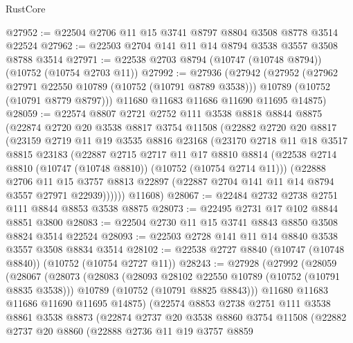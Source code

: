 \begin{lexlean}{RustCore}
\begin{coremodule}
@27952 := @22504 @2706 @11 @15 @3741 @8797 @8804 @3508 @8778 @3514 @22524
@27962 := @22503 @2704 @141 @11 @14 @8794 @3538 @3557 @3508 @8788 @3514
@27971 := @22538 @2703 @8794 (@10747 (@10748 @8794)) (@10752 (@10754 @2703 @11))
@27992 := @27936
    (@27942
      (@27952
        (@27962 @27971 @22550 @10789 (@10752 (@10791 @8789 @3538)))
        @10789
        (@10752 (@10791 @8779 @8797)))
      @11680
      @11683
      @11686
      @11690
      @11695
      @14875)
@28059 := @22574
    @8807
    @2721
    @2752
    @111
    @3538
    @8818
    @8844
    @8875
    (@22874
      @2720
      @20
      @3538
      @8817
      @3754
      @11508
      (@22882
        @2720
        @20
        @8817
        (@23159
          @2719
          @11
          @19
          @3535
          @8816
          @23168
          (@23170
            @2718
            @11
            @18
            @3517
            @8815
            @23183
            (@22887
              @2715
              @2717
              @11
              @17
              @8810
              @8814
              (@22538 @2714 @8810 (@10747 (@10748 @8810)) (@10752 (@10754 @2714 @11)))
              (@22888
                @2706
                @11
                @15
                @3757
                @8813
                @22897
                (@22887 @2704 @141 @11 @14 @8794 @3557 @27971 @22939))))))
      @11608)
@28067 := @22484 @2732 @2738 @2751 @111 @8844 @8853 @3538 @8875
@28073 := @22495 @2731 @17 @102 @8844 @8851 @3800
@28083 := @22504 @2730 @11 @15 @3741 @8843 @8850 @3508 @8824 @3514 @22524
@28093 := @22503 @2728 @141 @11 @14 @8840 @3538 @3557 @3508 @8834 @3514
@28102 := @22538 @2727 @8840 (@10747 (@10748 @8840)) (@10752 (@10754 @2727 @11))
@28243 := @27928
    (@27992
      (@28059
        (@28067
          (@28073
            (@28083
              (@28093 @28102 @22550 @10789 (@10752 (@10791 @8835 @3538)))
              @10789
              (@10752 (@10791 @8825 @8843)))
            @11680
            @11683
            @11686
            @11690
            @11695
            @14875)
          (@22574
            @8853
            @2738
            @2751
            @111
            @3538
            @8861
            @3538
            @8873
            (@22874
              @2737
              @20
              @3538
              @8860
              @3754
              @11508
              (@22882
                @2737
                @20
                @8860
                (@22888
                  @2736
                  @11
                  @19
                  @3757
                  @8859

\end{coremodule}
\end{lexlean}

